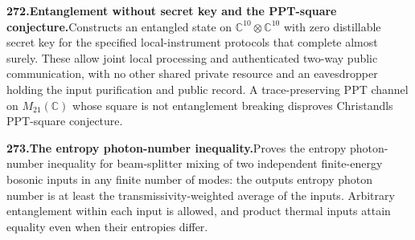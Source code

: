 \documentclass[11pt,a4paper]{article}
\begin{document}
  \par \begin{minipage}{\linewidth}
  \fontsize{10.5}{12.6}\selectfont\RaggedRight
  \hypertarget{result 272}{}
  {\bfseries\textcolor{muted}{272.}\enspace Entanglement without secret key and the PPT-square conjecture.}\enspace Constructs an entangled state on $\mathbb C^{10}\otimes\mathbb C^{10}$ with zero distillable secret key for the specified local-instrument protocols that complete almost surely. These allow joint local processing and authenticated two-way public communication, with no other shared private resource and an eavesdropper holding the input purification and public record. A trace-preserving PPT channel on $M_{21}(\mathbb C)$ whose square is not entanglement breaking disproves Christandl\textquotesingle s PPT-square conjecture.\par
  \end{minipage}\par\vspace{5pt}



  \par \begin{minipage}{\linewidth}
  \fontsize{10.5}{12.6}\selectfont\RaggedRight
  \hypertarget{result 273}{}
  {\bfseries\textcolor{muted}{273.}\enspace The entropy photon-number inequality.}\enspace Proves the entropy photon-number inequality for beam-splitter mixing of two independent finite-energy bosonic inputs in any finite number of modes: the output\textquotesingle s entropy photon number is at least the transmissivity-weighted average of the inputs\textquotesingle. Arbitrary entanglement within each input is allowed, and product thermal inputs attain equality even when their entropies differ.\par
  \end{minipage}\par\vspace{5pt}
\end{document}
